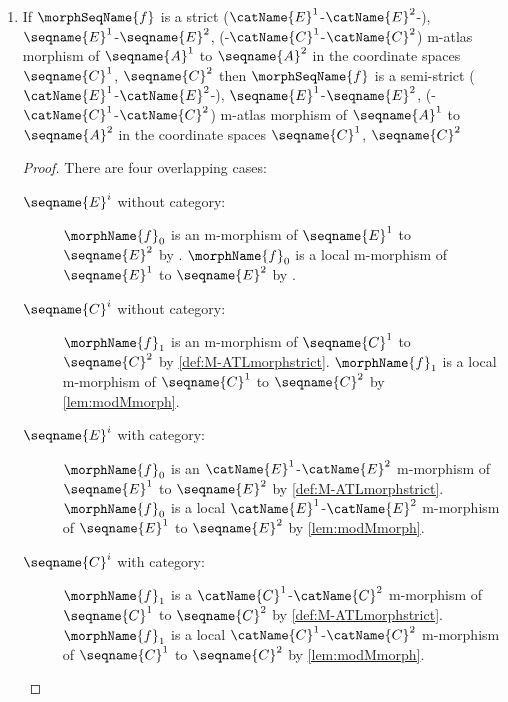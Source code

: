 \documentclass{article}
\begin{document}
\begin{lemma}
\begin{enumerate}
\begin{proof}
$\morphName{f}'_1 \maps \seqname{C}'^1 \to \seqname{C}'^2$ and
$\morphName{f}'_1 \maps \seqname{C}^1 \to \seqname{C}'^2$ are model
functions by hypothesis.

$\seqname{C}^i \submod \seqname{C}'^i$ by hypothesis,

$C^i$ is an open subset of $C'^i$ by .

The expanded model space does not change the atlases or the commutation.
\end{proof}

\item
\label{M-ATLmorph:strictissemi}
If $\morphSeqName{f}$ is a strict
\nobreaks
  {
    {($\catName{E}^1$-$\catName{E}^2$-)},
    {$\seqname{E}^1$-$\seqname{E}^2$},
    {(-$\catName{C}^1$-$\catName{C}^2$)}
  }
m-atlas morphism of $\seqname{A}^1$ to $\seqname{A}^2$ in the
coordinate spaces $\seqname{C}^1$, $\seqname{C}^2$ then
$\morphSeqName{f}$ is a semi-strict
\nobreaks
  {
    {($\catName{E}^1$-$\catName{E}^2$-)},
    {$\seqname{E}^1$-$\seqname{E}^2$},
    {(-$\catName{C}^1$-$\catName{C}^2$)}
  }
m-atlas morphism of $\seqname{A}^1$ to $\seqname{A}^2$ in the
coordinate spaces $\seqname{C}^1$, $\seqname{C}^2$

\begin{proof}
There are four overlapping cases:
\begin{description}
\item[$\seqname{E}^i$ without category:]
$\morphName{f}_0$ is an m-morphism of $\seqname{E}^1$ to $\seqname{E}^2$
by . $\morphName{f}_0$ is a local
m-morphism of $\seqname{E}^1$ to $\seqname{E}^2$ by
.

\item[$\seqname{C}^i$ without category:]
$\morphName{f}_1$ is an m-morphism of $\seqname{C}^1$ to $\seqname{C}^2$
by \cref{def:M-ATLmorphstrict}. $\morphName{f}_1$ is a local m-morphism
of $\seqname{C}^1$ to $\seqname{C}^2$ by \cref{lem:modMmorph}.

\item[$\seqname{E}^i$ with category:]
$\morphName{f}_0$ is an $\catName{E}^1$-$\catName{E}^2$ m-morphism of
$\seqname{E}^1$ to $\seqname{E}^2$ by \cref{def:M-ATLmorphstrict}.
$\morphName{f}_0$ is a local $\catName{E}^1$-$\catName{E}^2$ m-morphism
of $\seqname{E}^1$ to $\seqname{E}^2$ by \cref{lem:modMmorph}.

\item[$\seqname{C}^i$ with category:]
$\morphName{f}_1$ is a $\catName{C}^1$-$\catName{C}^2$ m-morphism of
$\seqname{C}^1$ to $\seqname{C}^2$ by \cref{def:M-ATLmorphstrict}.
$\morphName{f}_1$ is a local $\catName{C}^1$-$\catName{C}^2$ m-morphism
of $\seqname{C}^1$ to $\seqname{C}^2$ by \cref{lem:modMmorph}.


\end{description}
\end{proof}
\end{enumerate}
\end{lemma}
\end{document}

